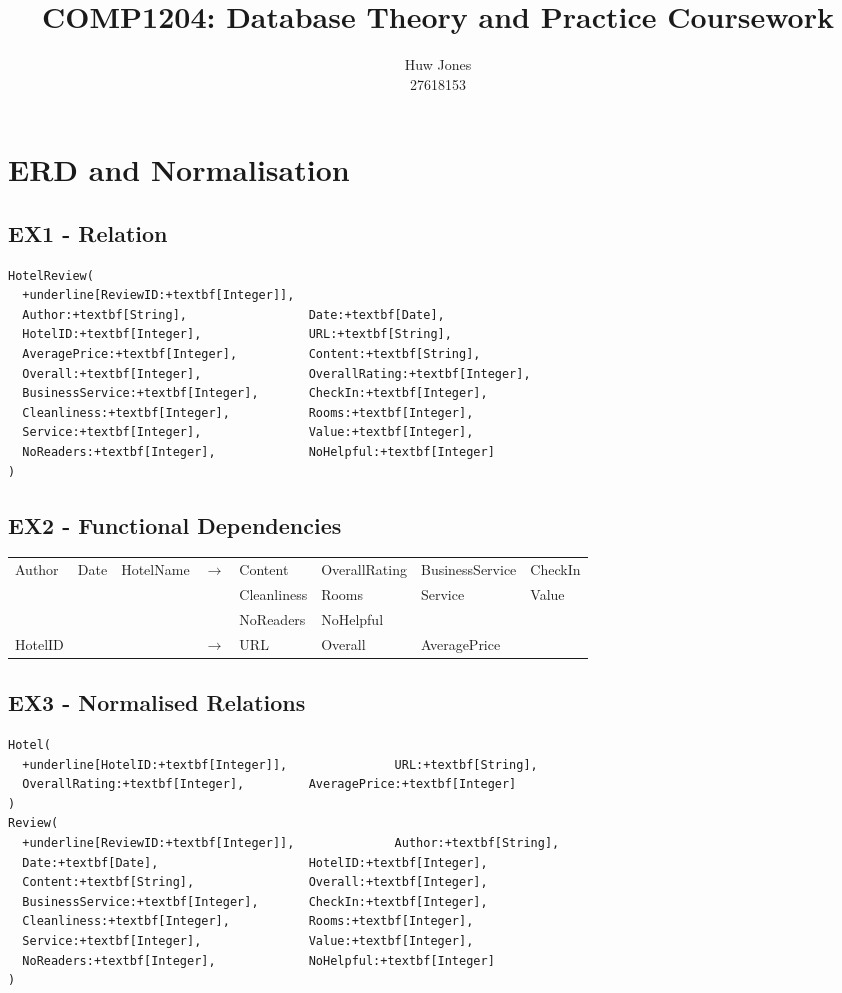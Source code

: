 \documentclass[a4paper]{article}
\author{Huw Jones \\27618153}
\title{COMP1204: Database Theory and Practice Coursework}
\begin{document}
\maketitle
\section{ERD and Normalisation}

%
%
\subsection{EX1 - Relation}
\begin{Verbatim}[commandchars=+\[\]]
HotelReview(
  +underline[ReviewID:+textbf[Integer]],
  Author:+textbf[String],                 Date:+textbf[Date],
  HotelID:+textbf[Integer],               URL:+textbf[String],
  AveragePrice:+textbf[Integer],          Content:+textbf[String],
  Overall:+textbf[Integer],               OverallRating:+textbf[Integer],
  BusinessService:+textbf[Integer],       CheckIn:+textbf[Integer],
  Cleanliness:+textbf[Integer],           Rooms:+textbf[Integer],
  Service:+textbf[Integer],               Value:+textbf[Integer],
  NoReaders:+textbf[Integer],             NoHelpful:+textbf[Integer]
)
\end{Verbatim}

%
%
\subsection{EX2 - Functional Dependencies}
\begin{tabular}{l l l c l l l l}
Author & Date & HotelName & $\to$ & Content & OverallRating & BusinessService & CheckIn \\
&&&& Cleanliness & Rooms & Service & Value \\
&&&& NoReaders & NoHelpful & & \\
HotelID & & & $\to$ & URL & Overall & AveragePrice & \\
\end{tabular}

%
%
\subsection{EX3 - Normalised Relations}
\begin{Verbatim}[commandchars=+\[\]]
Hotel(
  +underline[HotelID:+textbf[Integer]],               URL:+textbf[String],
  OverallRating:+textbf[Integer],         AveragePrice:+textbf[Integer]
)
Review(
  +underline[ReviewID:+textbf[Integer]],              Author:+textbf[String],
  Date:+textbf[Date],                     HotelID:+textbf[Integer],
  Content:+textbf[String],                Overall:+textbf[Integer],
  BusinessService:+textbf[Integer],       CheckIn:+textbf[Integer],
  Cleanliness:+textbf[Integer],           Rooms:+textbf[Integer],
  Service:+textbf[Integer],               Value:+textbf[Integer],
  NoReaders:+textbf[Integer],             NoHelpful:+textbf[Integer]
)
\end{Verbatim}
\end{document}
